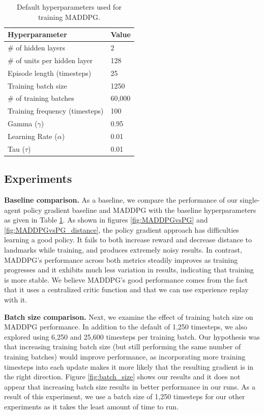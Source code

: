 \documentclass{article}
\begin{document}
\begin{table}[h!]
  \begin{center}
    
    \begin{tabular} {|l|l|} %
      \hline
      \textbf{Hyperparameter} & \textbf{Value} \\
      \hline
      \# of hidden layers & 2 \\
      \# of units per hidden layer & 128 \\
      Episode length (timesteps) & 25 \\
      Training batch size & 1250 \\
      \# of training batches & 60,000 \\
			Training frequency (timesteps) & 100 \\
      Gamma ($\gamma$) & 0.95 \\
      Learning Rate ($\alpha$) & 0.01 \\
			Tau ($\tau$) & 0.01 \\
      \hline
    \end{tabular}
  \end{center}
	\caption{Default hyperparameters used for training MADDPG.}
	\label{tab:basecase_parameters}
\end{table}

\subsection{Experiments}

\textbf{Baseline comparison.} As a baseline, we compare the performance of our single-agent policy gradient baseline and MADDPG with the baseline hyperparameters as given in Table \ref{tab:basecase_parameters}. As shown in figures \ref{fig:MADDPGvsPG} and \ref{fig:MADDPGvsPG_distance}, the policy gradient approach has difficulties learning a good policy. It fails to both increase reward and decrease distance to landmarks while training, and produces extremely noisy results. In contrast, MADDPG's performance across both metrics steadily improves as training progresses and it exhibits much less variation in results, indicating that training is more stable. We believe MADDPG's good performance comes from the fact that it uses a centralized critic function and that we can use experience replay with it.

\textbf{Batch size comparison.} Next, we examine the effect of training batch size on MADDPG performance. In addition to the default of 1,250 timesteps, we also explored using 6,250 and 25,600 timesteps per training batch. Our hypothesis was that increasing training batch size (but still performing the same number of training batches) would improve performance, as incorporating more training timesteps into each update makes it more likely that the resulting gradient is in the right direction. Figure \ref{fig:batch_size} shows our results and it does not appear that increasing batch size results in better performance in our runs. As a result of this experiment, we use a batch size of 1,250 timesteps for our other experiments as it takes the least amount of time to run.
\end{document}
